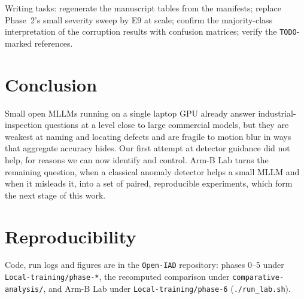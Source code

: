 \documentclass[conference]{IEEEtran}
\begin{document}
Writing tasks: regenerate the manuscript tables from the manifests; replace
Phase~2's small severity sweep by E9 at scale; confirm the majority-class
interpretation of the corruption results with confusion matrices; verify the
\texttt{TODO}-marked references.

\section{Conclusion}

Small open MLLMs running on a single laptop GPU already answer industrial-inspection
questions at a level close to large commercial models, but they are weakest at
naming and locating defects and are fragile to motion blur in ways that aggregate
accuracy hides. Our first attempt at detector guidance did not help, for reasons we
can now identify and control. Arm-B Lab turns the remaining question, when a
classical anomaly detector helps a small MLLM and when it misleads it, into a set of
paired, reproducible experiments, which form the next stage of this work.

\section*{Reproducibility}
Code, run logs and figures are in the \texttt{Open-IAD} repository: phases 0--5 under
\texttt{Local-training/phase-*}, the recomputed comparison under
\texttt{comparative-analysis/}, and Arm-B Lab under \texttt{Local-training/phase-6}
(\texttt{./run\_lab.sh}).



\end{document}

